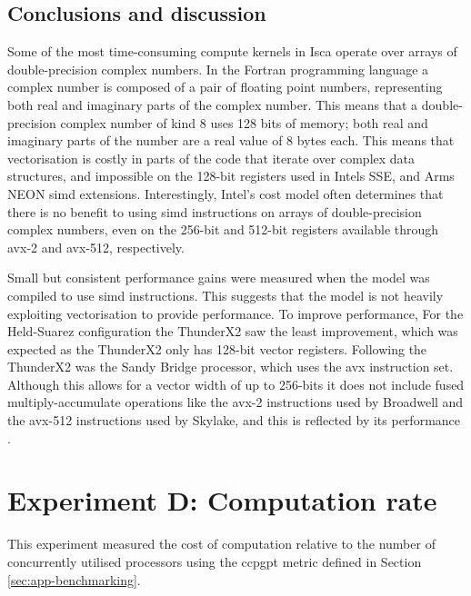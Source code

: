 \documentclass[a4paper,11pt]{report}
\begin{document}
\subsection{Conclusions and discussion}
Some of the most time-consuming compute kernels in Isca operate over arrays of double-precision complex numbers. In the Fortran programming language a complex number is composed of a pair of floating point numbers, representing both real and imaginary parts of the complex number. This means that a double-precision complex number of kind 8 uses 128 bits of memory; both real and imaginary parts of the number are a real value of 8 bytes each. This means that vectorisation is costly in parts of the code that iterate over complex data structures, and impossible on the 128-bit registers used in Intels SSE, and Arms NEON \gls{simd} extensions. Interestingly, Intel's cost model often determines that there is no benefit to using \gls{simd} instructions on arrays of double-precision complex numbers, even on the 256-bit and 512-bit registers available through \gls{avx}-2 and \gls{avx}-512, respectively.
\par
Small but consistent performance gains were measured when the model was compiled to use \gls{simd} instructions. This suggests that the model is not heavily exploiting vectorisation to provide performance. To improve performance, For the Held-Suarez configuration the ThunderX2 saw the least improvement, which was expected as the ThunderX2 only has 128-bit vector registers. Following the ThunderX2 was the Sandy Bridge processor, which uses the \gls{avx} instruction set. Although this allows for a vector width of up to 256-bits it does not include fused multiply-accumulate operations like the \gls{avx}-2 instructions used by Broadwell and the \gls{avx}-512 instructions used by Skylake, and this is reflected by its performance \cite{reinders2013intel, intel2017avx}.



\section{Experiment D: Computation rate}
This experiment measured the cost of computation relative to the number of concurrently utilised processors using the \gls{ccpgpt} metric defined in Section \ref{sec:app-benchmarking}. %
\label{sec:comm-analysis}
\end{document}

